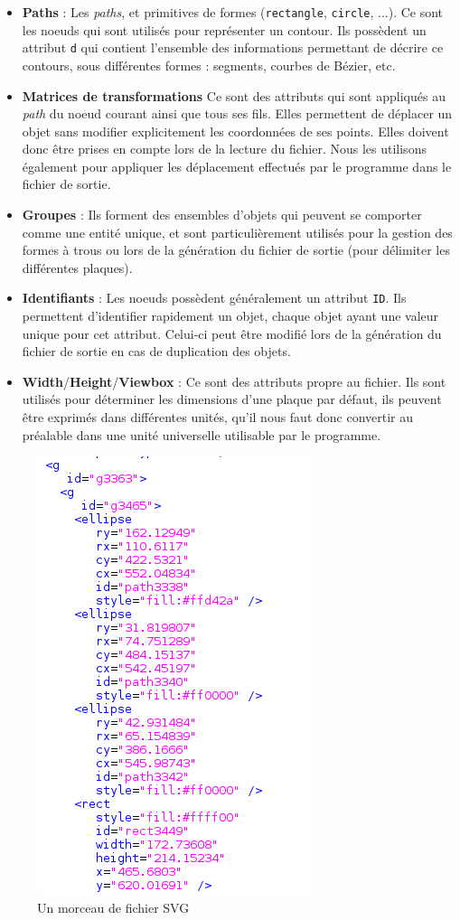 \begin{itemize}
    \item \textbf{Paths} : Les \textit{paths}, et primitives de formes (\texttt{rectangle}, \texttt{circle}, ...). Ce sont les noeuds qui sont utilisés pour représenter un contour. Ils possèdent un attribut \texttt{d} qui contient l'ensemble des informations permettant de décrire ce contours, sous différentes formes : segments, courbes de Bézier, etc.
    \item \textbf{Matrices de transformations} Ce sont des attributs qui sont appliqués au \textit{path} du noeud courant ainsi que tous ses fils. Elles permettent de déplacer un objet sans modifier explicitement les coordonnées de ses points. Elles doivent donc être prises en compte lors de la lecture du fichier. Nous les utilisons également pour appliquer les déplacement effectués par le programme dans le fichier de sortie.
    \item \textbf{Groupes} : Ils forment des ensembles d'objets qui peuvent se comporter comme une entité unique, et sont particulièrement utilisés pour la gestion des formes à trous ou lors de la génération du fichier de sortie (pour délimiter les différentes plaques).
    \item \textbf{Identifiants} : Les noeuds possèdent généralement un attribut \texttt{ID}. Ils permettent d'identifier rapidement un objet, chaque objet ayant une valeur unique pour cet attribut. Celui-ci peut être modifié lors de la génération du fichier de sortie en cas de duplication des objets.
    \item \textbf{Width}/\textbf{Height}/\textbf{Viewbox} : Ce sont des attributs propre au fichier. Ils sont utilisés pour déterminer les dimensions d'une plaque par défaut, ils peuvent être exprimés dans différentes unités, qu'il nous faut donc convertir au préalable dans une unité universelle utilisable par le programme.
\end{itemize}

\begin{figure}[H]
\centering
\includegraphics[scale=0.6]{img/svg.png}
\caption{Un morceau de fichier SVG}
\label{fig:svg}
\end{figure}

